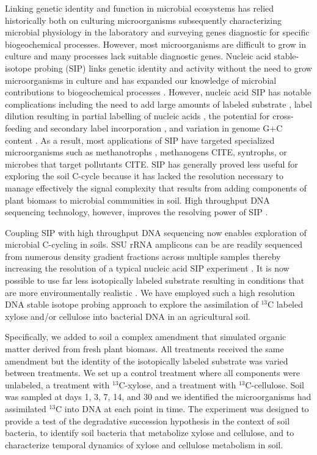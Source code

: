 Linking genetic identity and function in microbial ecosystems has relied
historically both on culturing microorganisms subsequently characterizing
microbial physiology in the laboratory and surveying genes diagnostic for
specific biogeochemical processes. However, most
microorganisms are difficult to grow in culture \citep{Janssen2006} and many
processes lack suitable diagnostic genes. Nucleic acid stable-isotope probing
(SIP) links genetic identity and activity without the need to grow
microorganisms in culture and has expanded our knowledge of microbial
contributions to biogeochemical processes \citep{Chen_Murrell_2010}. However,
nucleic acid SIP has notable complications including the need to add large
amounts of labeled substrate \citep{radajewski2000stable}, label dilution
resulting in partial labelling of nucleic acids
\citep{radajewski2000stable,Manefield_2002,McDonald_2005}, the potential for
cross-feeding and secondary label incorporation
\citep{Morris_2002,Hutchens2004,14686943,DeRito2005,McDonald_2005,Ziegler_2005},
and variation in genome G$+$C content
\citep{Buckley_2007,9780408708036,Holben1995,Nusslein1999}. As a result, most
applications of SIP have targeted specialized microorganisms such as
methanotrophs \citep{radajewski2000stable}, methanogens CITE, syntrophs, or
microbes that target pollutants CITE. SIP has generally proved less useful for
exploring the soil C-cycle because it has lacked the resolution necessary to
manage effectively the signal complexity that results from adding components of
plant biomass to microbial communities in soil. High throughput DNA sequencing
technology, however, improves the resolving power of SIP \citep{Aoyagi2015}. 

Coupling SIP with high throughput DNA sequencing now enables exploration of
microbial C-cycling in soils. SSU rRNA amplicons can be are readily sequenced
from numerous density gradient fractions across multiple samples thereby
increasing the resolution of a typical nucleic acid SIP experiment
\citep{Verastegui_2014}. It is now possible to use far less isotopically
labeled substrate resulting in conditions that are more environmentally
realistic \citep{Aoyagi2015}. We have employed such a high resolution DNA
stable isotope probing approach to explore the assimilation of $^{13}$C labeled
xylose and/or cellulose into bacterial DNA in an agricultural soil. 

Specifically, we added to soil a complex amendment that simulated organic
matter derived from fresh plant biomass. All treatments received the same
amendment but the identity of the isotopically labeled substrate was varied
between treatments. We set up a control treatment where all components were
unlabeled, a treatment with $^{13}$C-xylose, and a treatment with
$^{13}$C-cellulose. Soil was sampled at days 1, 3, 7, 14, and 30 and we
identified the microorganisms had assimilated $^{13}$C into DNA at each point
in time. The experiment was designed to provide a test of the
degradative succession hypothesis in the context of soil bacteria, to identify
soil bacteria that metabolize xylose and cellulose, and to characterize
temporal dynamics of xylose and cellulose metabolism in soil. 

